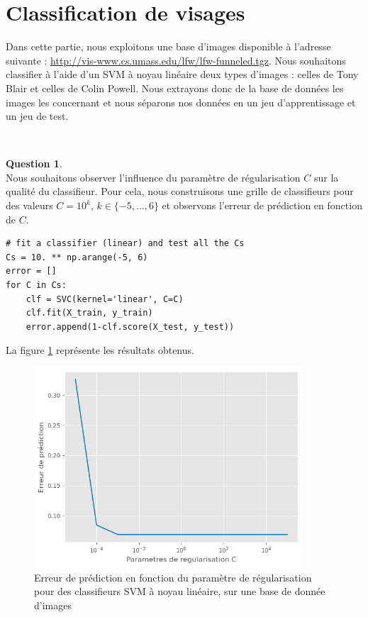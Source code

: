 \documentclass[11pt,a4paper]{article}
\theoremstyle{definition}
\newtheorem{Qu}{Question}
\begin{document}
\section{Classification de visages}

Dans cette partie, nous exploitons une base d'images disponible à l'adresse suivante : \url{http://vis-www.cs.umass.edu/lfw/lfw-funneled.tgz}. Nous souhaitons classifier à l'aide d'un SVM à noyau linéaire deux types d'images : celles de Tony Blair et celles de Colin Powell. Nous extrayons donc de la base de données les images les concernant et nous séparons nos données en un jeu d'apprentissage et un jeu de test. 


\

\begin{Qu}~\\

Nous souhaitons observer l'influence du paramètre de régularisation $C$ sur la qualité du classifieur. Pour cela, nous construisons une grille de classifieurs pour des valeurs $C=10^{k}$, $k\in\{-5,\ldots,6\}$ et observons l'erreur de prédiction en fonction de $C$. 

\begin{verbatim}
# fit a classifier (linear) and test all the Cs
Cs = 10. ** np.arange(-5, 6)
error = []
for C in Cs:
    clf = SVC(kernel='linear', C=C)
    clf.fit(X_train, y_train)
    error.append(1-clf.score(X_test, y_test))
\end{verbatim}

La figure \ref{qu4} représente les résultats obtenus.


 
\begin{figure}[h!]\centering
\includegraphics[width=10cm]{Images/erreur.png}
\caption{Erreur de prédiction en fonction du paramètre de régularisation pour des classifieurs SVM à noyau linéaire, sur une base de donnée d'images}
\label{qu4}
\end{figure}


\end{Qu}
\end{document}
